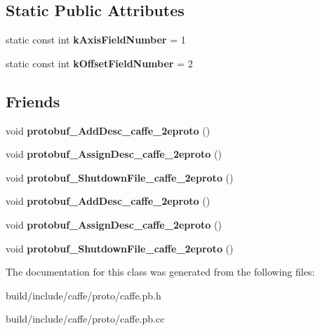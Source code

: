 \subsection*{Static Public Attributes}
\begin{DoxyCompactItemize}
\item 
\mbox{\label{classcaffe_1_1_crop_parameter_acf36a56dec56a7e62d9650dd29bd69cb}} 
static const int {\bfseries k\+Axis\+Field\+Number} = 1
\item 
\mbox{\label{classcaffe_1_1_crop_parameter_a2b0005005a9e14bbe638aa8bf6bac33f}} 
static const int {\bfseries k\+Offset\+Field\+Number} = 2
\end{DoxyCompactItemize}
\subsection*{Friends}
\begin{DoxyCompactItemize}
\item 
\mbox{\label{classcaffe_1_1_crop_parameter_a2670a9c8ffd0e5105cf7522cd6f8613d}} 
void {\bfseries protobuf\+\_\+\+Add\+Desc\+\_\+caffe\+\_\+2eproto} ()
\item 
\mbox{\label{classcaffe_1_1_crop_parameter_a7f145bddbdde78003d27e42c7e003d23}} 
void {\bfseries protobuf\+\_\+\+Assign\+Desc\+\_\+caffe\+\_\+2eproto} ()
\item 
\mbox{\label{classcaffe_1_1_crop_parameter_a026784a8e4e76f1b4daf9d033d2ece83}} 
void {\bfseries protobuf\+\_\+\+Shutdown\+File\+\_\+caffe\+\_\+2eproto} ()
\item 
\mbox{\label{classcaffe_1_1_crop_parameter_a2670a9c8ffd0e5105cf7522cd6f8613d}} 
void {\bfseries protobuf\+\_\+\+Add\+Desc\+\_\+caffe\+\_\+2eproto} ()
\item 
\mbox{\label{classcaffe_1_1_crop_parameter_a7f145bddbdde78003d27e42c7e003d23}} 
void {\bfseries protobuf\+\_\+\+Assign\+Desc\+\_\+caffe\+\_\+2eproto} ()
\item 
\mbox{\label{classcaffe_1_1_crop_parameter_a026784a8e4e76f1b4daf9d033d2ece83}} 
void {\bfseries protobuf\+\_\+\+Shutdown\+File\+\_\+caffe\+\_\+2eproto} ()
\end{DoxyCompactItemize}


The documentation for this class was generated from the following files\+:\begin{DoxyCompactItemize}
\item 
build/include/caffe/proto/caffe.\+pb.\+h\item 
build/include/caffe/proto/caffe.\+pb.\+cc\end{DoxyCompactItemize}
